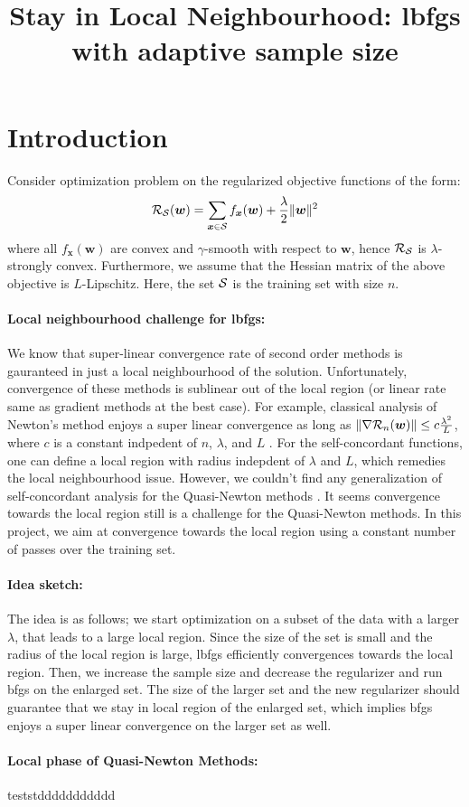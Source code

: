 \documentclass{article}
\author{}
\title{Stay in Local Neighbourhood: lbfgs with adaptive sample size}
\newcommand{\x}{{\bm{x}}} %
\newcommand{\w}{{\bm{w}}} %
\newcommand{\risk}{{\cal R}} %
\renewcommand{\S}{{\cal S}} %
\begin{document}
\maketitle


\section{Introduction}
Consider optimization problem on the regularized objective functions of the
form:
\begin{align}
	\risk_{\S} (\w) = \sum_{\x \in \S} f_\x(\w) + \frac{\lambda}{2}\|\w\|^2
\end{align}
where all $f_\x(\w)$ are convex and $\gamma$-smooth with respect to $\w$, hence
$\risk_{\S}$ is $\lambda$-strongly convex. Furthermore, we assume that the
Hessian matrix of the above objective is $L$-Lipschitz. Here, the set $\S$ is
the training set with size $n$. 
\paragraph{Local neighbourhood challenge for lbfgs:} 
We know that super-linear convergence rate of second order methods is
gauranteed in just a  local neighbourhood of the solution.
Unfortunately, convergence of these methods is sublinear out of the local
region (or linear rate same as gradient methods at the best case).
For example, classical analysis of Newton's method enjoys a super linear convergence as long as $\| \nabla \risk_n(\w) \| \leq c \frac{\lambda^2}{L}$, where $c$ is a constant indpedent of $n$, $\lambda$, and $L$ \cite{boyd04}. 
For the self-concordant functions, one can
define a local region with radius indepdent of $\lambda$ and $L$, which remedies
the local neighbourhood issue. However, we couldn't find any generalization of
self-concordant analysis for the Quasi-Newton methods \cite{pilanci2015newton}.
It seems convergence towards the local region still is a challenge for the
Quasi-Newton methods. In this project, we aim at convergence towards the
local region using a constant number of passes over the training set.
\paragraph{Idea sketch:}
The idea is as follows; we start optimization on a subset of the data with a
larger $\lambda$, that leads to a large local region. Since the size of the set
is small and the radius of the local region is large, lbfgs efficiently
convergences towards the local region. Then, we increase the sample size and
decrease the regularizer and run bfgs on the enlarged set. The size of the
larger set and the new regularizer should guarantee that we stay in local region
of the enlarged set, which implies bfgs enjoys a super linear convergence on the
larger set as well. 
\paragraph{Local phase of Quasi-Newton Methods:}
teststddddddddddd


\end{document}
